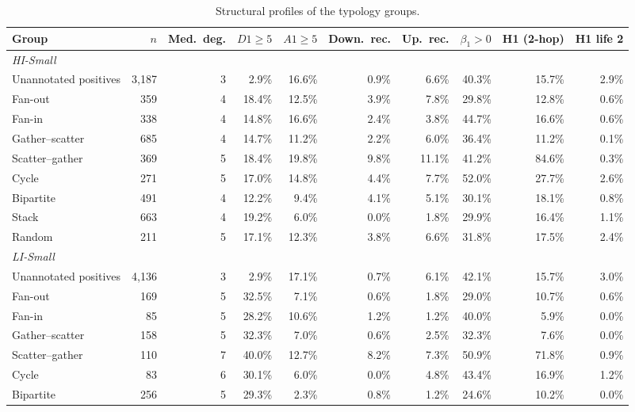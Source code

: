\begin{table}[htbp]
\centering
\scriptsize
\caption{Structural profiles of the typology groups.}
\label{tab:typoprofile}
\setlength{\tabcolsep}{3pt}
\begin{threeparttable}
\begin{tabular}{lrrrrrrrrr}
\toprule
Group & $n$ & Med.\ deg. & $D1\ge5$ & $A1\ge5$ & Down.\ rec. & Up.\ rec. & $\beta_1>0$ & H1 (2-hop) & H1 life 2 \\
\midrule
\multicolumn{10}{l}{\textit{HI-Small}} \\
Unannotated positives & 3,187 & 3 & 2.9\% & 16.6\% & 0.9\% & 6.6\% & 40.3\% & 15.7\% & 2.9\% \\
Fan-out & 359 & 4 & 18.4\% & 12.5\% & 3.9\% & 7.8\% & 29.8\% & 12.8\% & 0.6\% \\
Fan-in & 338 & 4 & 14.8\% & 16.6\% & 2.4\% & 3.8\% & 44.7\% & 16.6\% & 0.6\% \\
Gather--scatter & 685 & 4 & 14.7\% & 11.2\% & 2.2\% & 6.0\% & 36.4\% & 11.2\% & 0.1\% \\
Scatter--gather & 369 & 5 & 18.4\% & 19.8\% & 9.8\% & 11.1\% & 41.2\% & 84.6\% & 0.3\% \\
Cycle & 271 & 5 & 17.0\% & 14.8\% & 4.4\% & 7.7\% & 52.0\% & 27.7\% & 2.6\% \\
Bipartite & 491 & 4 & 12.2\% & 9.4\% & 4.1\% & 5.1\% & 30.1\% & 18.1\% & 0.8\% \\
Stack & 663 & 4 & 19.2\% & 6.0\% & 0.0\% & 1.8\% & 29.9\% & 16.4\% & 1.1\% \\
Random & 211 & 5 & 17.1\% & 12.3\% & 3.8\% & 6.6\% & 31.8\% & 17.5\% & 2.4\% \\
\midrule
\multicolumn{10}{l}{\textit{LI-Small}} \\
Unannotated positives & 4,136 & 3 & 2.9\% & 17.1\% & 0.7\% & 6.1\% & 42.1\% & 15.7\% & 3.0\% \\
Fan-out & 169 & 5 & 32.5\% & 7.1\% & 0.6\% & 1.8\% & 29.0\% & 10.7\% & 0.6\% \\
Fan-in & 85 & 5 & 28.2\% & 10.6\% & 1.2\% & 1.2\% & 40.0\% & 5.9\% & 0.0\% \\
Gather--scatter & 158 & 5 & 32.3\% & 7.0\% & 0.6\% & 2.5\% & 32.3\% & 7.6\% & 0.0\% \\
Scatter--gather & 110 & 7 & 40.0\% & 12.7\% & 8.2\% & 7.3\% & 50.9\% & 71.8\% & 0.9\% \\
Cycle & 83 & 6 & 30.1\% & 6.0\% & 0.0\% & 4.8\% & 43.4\% & 16.9\% & 1.2\% \\
Bipartite & 256 & 5 & 29.3\% & 2.3\% & 0.8\% & 1.2\% & 24.6\% & 10.2\% & 0.0\% \\

\end{tabular}
\end{threeparttable}
\end{table}
